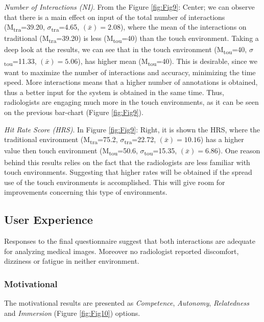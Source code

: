 \documentclass{sigchi}
\begin{document}
\textit{Number of Interactions (NI)}.  From the Figure \ref{fig:Fig9}: Center; we can observe that there is a main effect on input of the total number of interactions (M\textsubscript{tra}=39.20, $\sigma$\textsubscript{tra}=4.65, {}$\left({\bar x}\right)=2.08$), where the mean of the interactions on traditional (M\textsubscript{tra}=39.20) is less  (M\textsubscript{tou}=40) than the touch environment. Taking a deep look at the results, we can see that in the touch environment (M\textsubscript{tou}=40, $\sigma$\textsubscript{tou}=11.33, {}$\left({\bar x}\right)=5.06$), has higher mean (M\textsubscript{tou}=40). This is desirable, since  we want to maximize the number of interactions and accuracy, minimizing the time speed. More interactions means that a higher number of annotations is obtained, thus a better input for the system is obtained in the same time. Thus, radiologists are engaging much more in the touch environments, as it can be seen on the previous bar-chart (Figure \ref{fig:Fig9}).

\textit{Hit Rate Score (HRS)}. In Figure \ref{fig:Fig9}: Right, it is shown the HRS, where the traditional environment (M\textsubscript{tra}=75.2, $\sigma$\textsubscript{tra}=22.72, {}$\left({\bar x}\right)=10.16$) has a higher value then touch environment (M\textsubscript{tou}=50.6, $\sigma$\textsubscript{tou}=15.35, {}$\left({\bar x}\right)=6.86$). One reason behind this results relies on the fact that the radiologists are less familiar with touch environments. Suggesting that higher rates
will be obtained if the spread use of the touch environments is accomplished. This will give room for improvements concerning  this type of environments.    


\subsection{User Experience}

Responses to the final questionnaire suggest that both interactions are adequate for analyzing medical images. Moreover no radiologist reported discomfort, dizziness or fatigue in neither environment.

\subsubsection{Motivational}

The motivational results are presented as \textit{Competence}, \textit{Autonomy}, \textit{Relatedness} and \textit{Immersion} (Figure \ref{fig:Fig10}) options.
\end{document}
